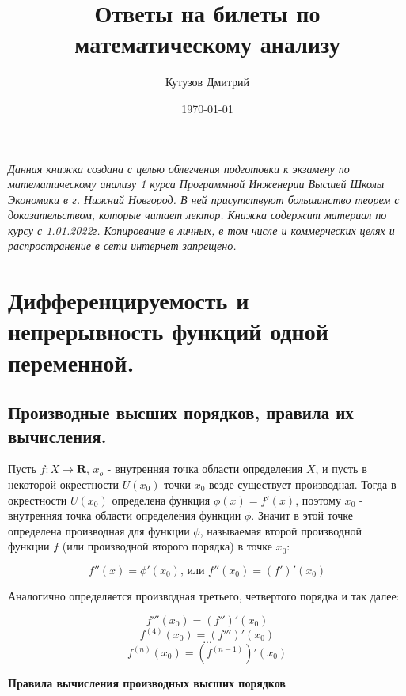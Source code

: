 \documentclass[a4paper,12pt]{article}
\author{Кутузов Дмитрий}
\title{Ответы на билеты по математическому анализу}
\date{\today}
\theoremstyle{plain} %
\theoremstyle{definition} %
\theoremstyle{remark} %
\begin{document}

\maketitle

\newpage

\textit{Данная книжка создана с целью облегчения подготовки к экзамену по
	математическому анализу 1 курса Программной Инженерии Высшей
	Школы Экономики в г. Нижний Новгород. В ней присутствуют
	большинство теорем с доказательством, которые читает лектор. Книжка
	содержит материал по курсу с 1.01.2022г. Копирование в личных, в том числе и коммерческих целях и
	распространение в сети интернет запрещено.}

\newpage


{
	\hypersetup{linkcolor=black}
	\tableofcontents
	\newpage
}


\section*{Дифференцируемость и непрерывность функций одной переменной.}


\subsection*{Производные высших порядков, правила их вычисления.}

Пусть $f: X \rightarrow \mathbf{R}$, $x_o$ - внутренняя точка области определения $X$, и пусть в некоторой окрестности $U(x_0)$ точки $x_0$ везде существует производная. Тогда в окрестности $U(x_0)$ определена функция $\phi(x) = f'(x)$, поэтому $x_0$ - внутренняя точка области определения функции $\phi$. Значит в этой точке определена производная для функции $\phi$, называемая второй производной функции $f$ (или производной второго порядка) в точке $x_0$:

\[
	f''(x) = \phi'(x_0) \text{, или } f''(x_0) = (f')'(x_0)
\]

Аналогично определяется производная третьего, четвертого порядка и так далее:

\[
	f'''(x_0) = (f'')'(x_0)
\]
\[
	f^{(4)}(x_0) = (f''')'(x_0)
\]
\[
	...
\]
\[
	f^{(n)}(x_0) = (f^{(n-1)})'(x_0)
\]

\textbf{Правила вычисления производных высших порядков}
\end{document}
